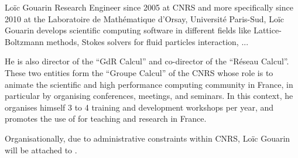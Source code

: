\begin{participant}[type=R,PM=0,gender=male]{Lo\"ic Gouarin}
  Research Engineer since 2005 at CNRS and more specifically since
  2010 at the Laboratoire de Mathématique d'Orsay, Université
  Paris-Sud, Loïc Gouarin develops scientific computing software in
  different fields like Lattice-Boltzmann methods, Stokes solvers for
  fluid particles interaction, ...

  He is also director of the ``GdR Calcul'' and co-director of the
  ``Réseau Calcul''. These two entities form the ``Groupe Calcul'' of
  the CNRS whose role is to animate the scientific and high
  performance computing community in France, in particular by
  organising conferences, meetings, and seminars. In this context, he
  organises himself 3 to 4 training and development workshops per
  year, and promotes the use of \Python for teaching and research in
  France.

  Organisationally, due to administrative constraints within
  CNRS, Loïc Gouarin will be attached to .
\end{participant}

